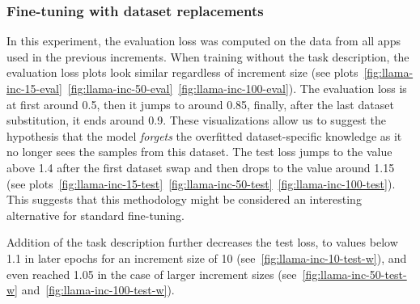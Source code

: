 \documentclass[licencjacka,en]{pracamgr}
\begin{document}
\subsubsection{Fine-tuning with dataset replacements}
In this experiment, the evaluation loss was computed on the data from all apps used in the previous increments.
When training without the task description, the evaluation loss plots look similar regardless of increment size (see plots~\ref{fig:llama-inc-15-eval}~\ref{fig:llama-inc-50-eval}~\ref{fig:llama-inc-100-eval}). The evaluation loss is at first around 0.5, then it jumps to around 0.85, finally, after the last dataset substitution, it ends around 0.9. These visualizations allow us to suggest the hypothesis that the model \emph{forgets} the overfitted dataset-specific knowledge as it no longer sees the samples from this dataset. The test loss jumps to the value above 1.4 after the first dataset swap and then drops to the value around 1.15 (see plots~\ref{fig:llama-inc-15-test}~\ref{fig:llama-inc-50-test}~\ref{fig:llama-inc-100-test}). This suggests that this methodology might be considered an interesting alternative for standard fine-tuning.

Addition of the task description further decreases the test loss, to values below 1.1 in later epochs for an increment size of 10 (see~\ref{fig:llama-inc-10-test-w}), and even reached 1.05 in the case of larger increment sizes (see~\ref{fig:llama-inc-50-test-w} and~\ref{fig:llama-inc-100-test-w}).
\end{document}
